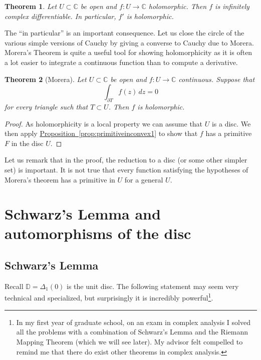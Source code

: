 \documentclass[12pt,openany]{book}
\newcommand{\C}{{\mathbb{C}}}
\newcommand{\D}{{\mathbb{D}}}
\theoremstyle{plain}
\newtheorem{thm}{Theorem}[section]
\theoremstyle{remark}
\theoremstyle{definition}
\theoremstyle{exercise}
\theoremstyle{example}
\newcommand{\propref}[1]{\hyperref[#1]{Proposition~\ref*{#1}}}
\begin{document}
\begin{thm}
Let $U \subset \C$ be open and $f \colon U \to \C$ holomorphic.  Then
$f$ is infinitely complex differentiable.  In particular, $f'$ is
holomorphic.
\end{thm}

The ``in particular'' is an important consequence.  Let us close the circle
of the various simple versions of Cauchy by giving a converse to Cauchy due
to Morera.  Morera's Theorem is quite a useful tool for showing
holomorphicity as it is often a lot easier to integrate a continuous
function than to compute a derivative.

\begin{thm}[Morera]
Let $U \subset \C$ be open and $f \colon U \to \C$ continuous.
Suppose that
\begin{equation*}
\int_{\partial T} f(z) \, dz = 0
\end{equation*}
for every triangle such that $T \subset U$.  Then $f$ is holomorphic.
\end{thm}

\begin{proof}
As holomorphicity is a local property we can assume that $U$ is a disc.
We then apply \propref{prop:primitiveinconvex1} to show that $f$ has
a primitive $F$ in the disc $U$.
\end{proof}

Let us remark that in the proof,
the reduction to a disc (or some other simpler set)
is important.  It is not true
that every function satisfying the hypotheses of Morera's theorem has a
primitive in $U$ for a general $U$.


\section{Schwarz's Lemma and automorphisms of the disc}
\label{sec:schwarz}

\subsection{Schwarz's Lemma}

Recall $\D = \Delta_1(0)$ is the unit disc.  The following statement may
seem very technical and specialized, but surprisingly it is incredibly
powerful\footnote{In my first year of graduate school, on an exam in complex
analysis I solved all the problems with a combination of
Schwarz's Lemma and
the Riemann
Mapping Theorem (which we will see later).  My advisor
felt compelled to remind me that there do exist other theorems in complex
analysis.}.
\end{document}
